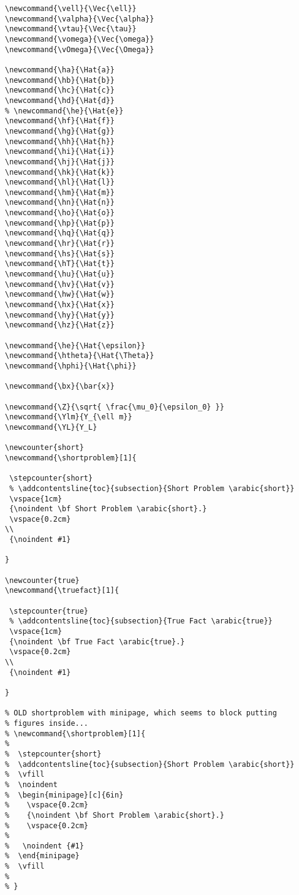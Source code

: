 {\begin{verbatim}
\newcommand{\vell}{\Vec{\ell}}
\newcommand{\valpha}{\Vec{\alpha}}
\newcommand{\vtau}{\Vec{\tau}}
\newcommand{\vomega}{\Vec{\omega}}
\newcommand{\vOmega}{\Vec{\Omega}}

\newcommand{\ha}{\Hat{a}}
\newcommand{\hb}{\Hat{b}}
\newcommand{\hc}{\Hat{c}}
\newcommand{\hd}{\Hat{d}}
% \newcommand{\he}{\Hat{e}}
\newcommand{\hf}{\Hat{f}}
\newcommand{\hg}{\Hat{g}}
\newcommand{\hh}{\Hat{h}}
\newcommand{\hi}{\Hat{i}}
\newcommand{\hj}{\Hat{j}}
\newcommand{\hk}{\Hat{k}}
\newcommand{\hl}{\Hat{l}}
\newcommand{\hm}{\Hat{m}}
\newcommand{\hn}{\Hat{n}}
\newcommand{\ho}{\Hat{o}}
\newcommand{\hp}{\Hat{p}}
\newcommand{\hq}{\Hat{q}}
\newcommand{\hr}{\Hat{r}}
\newcommand{\hs}{\Hat{s}}
\newcommand{\hT}{\Hat{t}}
\newcommand{\hu}{\Hat{u}}
\newcommand{\hv}{\Hat{v}}
\newcommand{\hw}{\Hat{w}}
\newcommand{\hx}{\Hat{x}}
\newcommand{\hy}{\Hat{y}}
\newcommand{\hz}{\Hat{z}}

\newcommand{\he}{\Hat{\epsilon}}
\newcommand{\htheta}{\Hat{\Theta}}
\newcommand{\hphi}{\Hat{\phi}}

\newcommand{\bx}{\bar{x}}

\newcommand{\Z}{\sqrt{ \frac{\mu_0}{\epsilon_0} }}
\newcommand{\Ylm}{Y_{\ell m}}
\newcommand{\YL}{Y_L}

\newcounter{short}
\newcommand{\shortproblem}[1]{

 \stepcounter{short}
 % \addcontentsline{toc}{subsection}{Short Problem \arabic{short}}
 \vspace{1cm}
 {\noindent \bf Short Problem \arabic{short}.}
 \vspace{0.2cm}
\\
 {\noindent #1}

}

\newcounter{true}
\newcommand{\truefact}[1]{

 \stepcounter{true}
 % \addcontentsline{toc}{subsection}{True Fact \arabic{true}}
 \vspace{1cm}
 {\noindent \bf True Fact \arabic{true}.}
 \vspace{0.2cm}
\\
 {\noindent #1}

}

% OLD shortproblem with minipage, which seems to block putting
% figures inside...
% \newcommand{\shortproblem}[1]{
% 
%  \stepcounter{short}
%  \addcontentsline{toc}{subsection}{Short Problem \arabic{short}}
%  \vfill
%  \noindent
%  \begin{minipage}[c]{6in}
%    \vspace{0.2cm}
%    {\noindent \bf Short Problem \arabic{short}.}
%    \vspace{0.2cm}
% 
%   \noindent {#1}
%  \end{minipage}
%  \vfill
% 
% }


\end{verbatim}}
